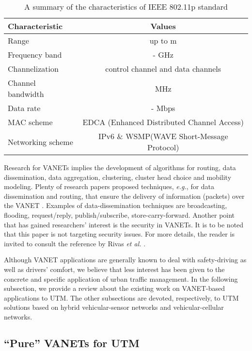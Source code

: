 \documentclass[10pt,onecolumn]{article}
\begin{document}
\begin{table}[h!]
\caption{A summary of the characteristics of IEEE 802.11p standard}
\label{tab.dsrc}
\centering

\begin{tabular}{ | l | c| } 
  \hline      
  \hline
  \textbf{Characteristic} 	& \textbf{Values} 	 \\ 
  \hline      \hline   
  
  Range  	   	& up to  m 	\\
  Frequency band  	&  -  GHz \\
  Channelization  	&  control channel and  data channels  \\
  Channel bandwidth  	& MHz 	   	\\
  Data rate  		&  -  Mbps 	\\
  MAC scheme 		& EDCA (Enhanced Distributed Channel Access)  	   \\
  Networking scheme 	& IPv6 \& WSMP(WAVE Short-Message Protocol)  	   \\

   \hline 
   \hline
\end{tabular} 
\end{table}

Research for VANETs implies the development of algorithms for routing, data dissemination, data aggregation, clustering, cluster head choice and mobility modeling.
Plenty of research papers proposed techniques, \textit{e.g.}, for data dissemination and routing, that ensure the delivery of information (packets) over the VANET \cite{Saleet2011}. 
Examples of data-dissemination techniques are broadcasting, flooding, request/reply, publish/subscribe, store-carry-forward.
Another point that has gained researchers' interest is the security in VANETs. It is to be noted that this paper is not targeting security issues. For more details, the reader is invited to consult the reference by Rivas \textit{et al.} \cite{Rivas2011}.

Although VANET applications are generally known to deal with safety-driving as well as drivers' comfort, we believe that less interest has been given to the concrete and specific application of urban traffic management.
In the following subsection, we provide a review about the existing work on VANET-based applications to UTM. The other subsections are devoted, respectively, to UTM solutions based on hybrid vehicular-sensor networks and vehicular-cellular networks. 


\subsection{``Pure'' VANETs for UTM}
\label{vanet4utm}
\end{document}
